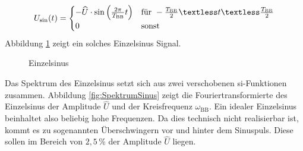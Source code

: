 \documentclass[12pt,report,final,twoside,accentcolor=tud9b,bigchapter]{tudreport}
\newcommand{\Usin}{U_\mathrm{sin}}
\begin{document}
\begin{equation}
   \Usin(t) =
   \begin{cases}
     -\widehat{U} \cdot \sin \left(\frac{2 \pi}{T_{\mathrm{BB}}}t\right) & \text{für } -\frac{T_{\mathrm{BB}}}{2} \textless t \textless \frac{T_{\mathrm{BB}}}{2} \\
     0 & \text{sonst} \\
     
   \end{cases}
\end{equation}
Abbildung \ref{fig:Einzelsinus} zeigt ein solches Einzelsinus Signal.
\begin{figure}[h!]
\centering
\caption{Einzelsinus}
  \label{fig:Einzelsinus}
\end{figure}
Das Spektrum des Einzelsinus setzt sich aus zwei verschobenen si-Funktionen zusammen. Abbildung \ref{fig:SpektrumSinus} zeigt die Fouriertransformierte des Einzelsinus der Amplitude $\widehat{U}$ und der Kreisfrequenz $\omega_{\mathrm{BB}}$. Ein idealer Einzelsinus beinhaltet also beliebig hohe Frequenzen. Da dies technisch nicht realisierbar ist, kommt es zu sogenannten Überschwingern vor und hinter dem Sinuspuls. Diese sollen im Bereich von $2,5\,\mathrm{\%}$ der Amplitude $\widehat{U}$ liegen. \cite{Frey2015a, Harzheim2017, Jatta2013, TechCoSIS}
\end{document}
